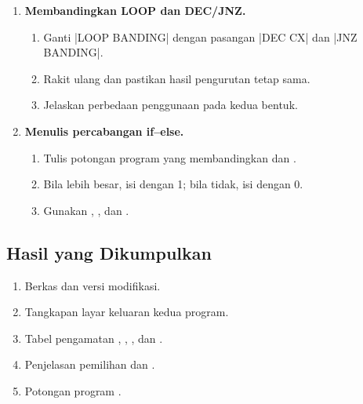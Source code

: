 \begin{enumerate}
    \item \textbf{Membandingkan LOOP dan DEC/JNZ.}
    \begin{enumerate}
        \item Ganti \lstasm|LOOP BANDING| dengan pasangan
              \lstasm|DEC CX| dan \lstasm|JNZ BANDING|.
        \item Rakit ulang dan pastikan hasil pengurutan tetap sama.
        \item Jelaskan perbedaan penggunaan  pada kedua
              bentuk.
    \end{enumerate}

    \item \textbf{Menulis percabangan if--else.}
    \begin{enumerate}
        \item Tulis potongan program yang membandingkan  dan
              .
        \item Bila  lebih besar, isi  dengan 1;
              bila tidak, isi dengan 0.
        \item Gunakan , , dan .
    \end{enumerate}
\end{enumerate}

\subsection{Hasil yang Dikumpulkan}

\begin{enumerate}
    \item Berkas  dan
           versi modifikasi.
    \item Tangkapan layar keluaran kedua program.
    \item Tabel pengamatan , , , dan
          .
    \item Penjelasan pemilihan  dan .
    \item Potongan program .
\end{enumerate}


